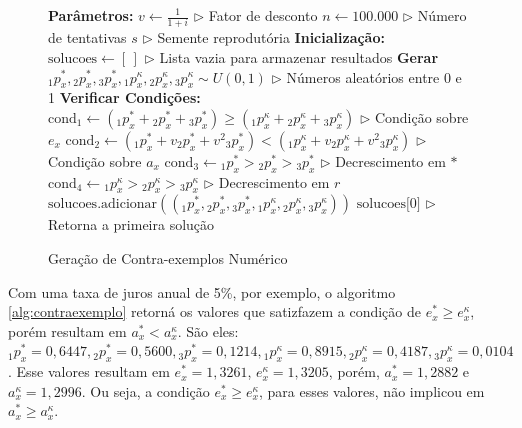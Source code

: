 \begin{figure}[H]
    \singlespacing\caption{Pseudocódigo Contra-exemplo Numérico}
    \begin{algorithm}[H]
        \caption{Geração de Contra-exemplos Numérico}
        \label{alg:contraexemplo}
        \begin{algorithmic}[1]
        \STATE \textbf{Parâmetros:}
        \STATE $v \gets \frac{1}{1+i}$ \hfill $\triangleright$ Fator de desconto
        \STATE $n \gets 100.000$ \hfill $\triangleright$ Número de tentativas
        \STATE $s$ \hfill $\triangleright$ Semente reprodutória
        \STATE \textbf{Inicialização:}
        \STATE $\text{solucoes} \gets [\,]$ \hfill $\triangleright$ Lista vazia para armazenar resultados
            \STATE \textbf{Gerar} ${}_{1}p^{*}_x, {}_{2}p^{*}_x, {}_{3}p^{*}_x, {}_{1}p^{\kappa}_x, {}_{2}p^{\kappa}_x, {}_{3}p^{\kappa}_x \sim U(0,1)$ \hfill $\triangleright$ Números aleatórios entre 0 e 1
            \STATE \textbf{Verificar Condições:}
            \STATE $\text{cond}_1 \gets ({}_{1}p^{*}_x + {}_{2}p^{*}_x + {}_{3}p^{*}_x) \geq ({}_{1}p^{\kappa}_x + {}_{2}p^{\kappa}_x + {}_{3}p^{\kappa}_x)$ \hfill $\triangleright$ Condição sobre $e_x$
            \STATE $\text{cond}_2 \gets ({}_{1}p^{*}_x + v {}_{2}p^{*}_x + v^2 {}_{3}p^{*}_x) < ({}_{1}p^{\kappa}_x + v {}_{2}p^{\kappa}_x + v^2 {}_{3}p^{\kappa}_x)$ \hfill $\triangleright$ Condição sobre $a_x$
            \STATE $\text{cond}_3 \gets {}_{1}p^{*}_x > {}_{2}p^{*}_x > {}_{3}p^{*}_x$ \hfill $\triangleright$ Decrescimento em $*$
            \STATE $\text{cond}_4 \gets {}_{1}p^{\kappa}_x > {}_{2}p^{\kappa}_x > {}_{3}p^{\kappa}_x$ \hfill $\triangleright$ Decrescimento em $r$
                \STATE $\text{solucoes.adicionar}(({}_{1}p^{*}_x, {}_{2}p^{*}_x, {}_{3}p^{*}_x, {}_{1}p^{\kappa}_x, {}_{2}p^{\kappa}_x, {}_{3}p^{\kappa}_x))$
            \ENDIF
        \ENDFOR
        \RETURN $\text{solucoes[0]}$ \hfill $\triangleright$ Retorna a primeira solução
        \end{algorithmic}
    \end{algorithm}
    \label{fig:pseudocodigo_numerico}
\end{figure}

Com uma taxa de juros anual de 5\%, por exemplo, o algoritmo \ref{alg:contraexemplo} retorná os valores que satizfazem a condição de $e^{*}_{x} \geq e^{\kappa}_{x}$, porém resultam em $a^{*}_{x} < a^{\kappa}_{x}$. São eles: ${}_{1}p^{*}_x = 0,6447, {}_{2}p^{*}_x = 0,5600, {}_{3}p^{*}_x = 0,1214, {}_{1}p^{\kappa}_x = 0,8915, {}_{2}p^{\kappa}_x = 0,4187, {}_{3}p^{\kappa}_x = 0,0104$. Esse valores resultam em $e^{*}_{x} = 1,3261$, $e^{\kappa}_{x} = 1,3205$, porém, $a^{*}_{x} = 1,2882$ e $a^{\kappa}_{x} = 1,2996$. Ou seja, a condição $e^{*}_{x} \geq e^{\kappa}_{x}$, para esses valores, não implicou em $a^{*}_{x} \geq a^{\kappa}_{x}$.
